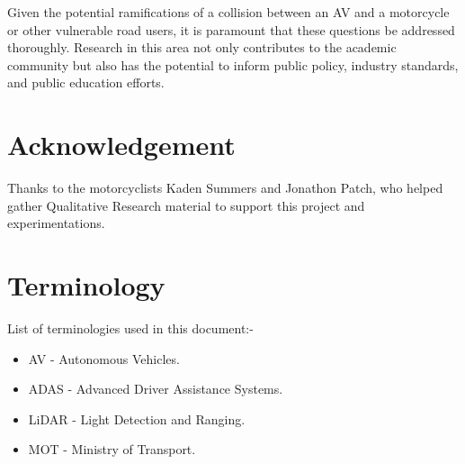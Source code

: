 \documentclass[conference]{IEEEtran}
\begin{document}
	Given the potential ramifications of a collision between an AV and a motorcycle or other vulnerable road users, it is paramount that these questions be addressed thoroughly. Research in this area not only contributes to the academic community but also has the potential to inform public policy, industry standards, and public education efforts.

\section{Acknowledgement}
    Thanks to the motorcyclists Kaden Summers and Jonathon Patch, who helped gather Qualitative Research material to support this project and experimentations. 

\section{Terminology}
	List of terminologies used in this document:-
	\begin{itemize}
		\item AV - Autonomous Vehicles.
		\item ADAS - Advanced Driver Assistance Systems.
		\item LiDAR - Light Detection and Ranging.
		\item MOT - Ministry of Transport.
	\end{itemize}
	

\nocite{*}
\renewcommand\refname{\section{Reference List}}
\small{
	}
\end{document}

